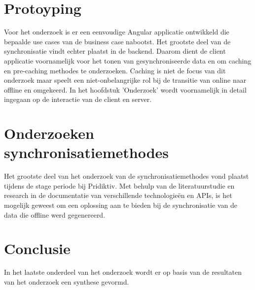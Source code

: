 \section{Protoyping}
Voor het onderzoek is er een eenvoudige Angular applicatie ontwikkeld die bepaalde use cases van de business case nabootst. Het grootste deel van de synchronisatie vindt echter plaatst in de backend. Daarom dient de client applicatie voornamelijk voor het tonen van gesynchroniseerde data en om caching en pre-caching methodes te onderzoeken. Caching is niet de focus van dit onderzoek maar speelt een niet-onbelangrijke rol bij de transitie van online naar offline en omgekeerd. In het hoofdstuk 'Onderzoek' wordt voornamelijk in detail ingegaan op de interactie van de client en server.
\section{Onderzoeken synchronisatiemethodes}
Het grootste deel van het onderzoek van de synchronisatiemethodes vond plaatst tijdens de stage periode bij Pridiktiv. Met behulp van de literatuurstudie en research in de documentatie van verschillende technologie\"en en APIs, is het mogelijk geweest om een oplossing aan te bieden bij de synchronisatie van de data die offline werd gegenereerd.
\section{Conclusie}
In het laatste onderdeel van het onderzoek wordt er op basis van de resultaten van het onderzoek een synthese gevormd.
